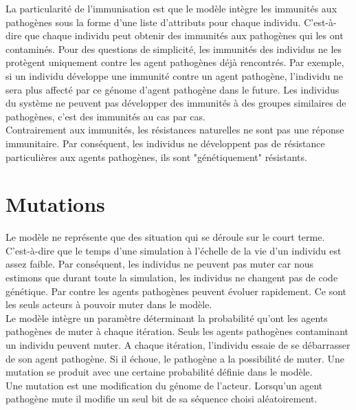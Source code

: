La particularité de l'immunisation est que le modèle intègre les immunités aux pathogènes sous la forme d'une liste d'attributs pour chaque individu. C'est-à-dire que chaque individu peut obtenir des immunités aux pathogènes qui les ont contaminés. Pour des questions de simplicité, les immunités des individus ne les protègent uniquement contre les agent pathogènes déjà rencontrés. Par exemple, si un individu développe une immunité contre un agent pathogène, l'individu ne sera plus affecté par ce génome d'agent pathogène dans le future. Les individus du système ne peuvent pas développer des immunités à des groupes similaires de pathogènes, c'est des immunités au cas par cas.\\

Contrairement aux immunités, les résistances naturelles ne sont pas une réponse immunitaire. Par conséquent, les individus ne développent pas de résistance particulières aux agents pathogènes, ils sont "génétiquement" résistants. 

\section{Mutations}

Le modèle ne représente que des situation qui se déroule sur le court terme. C'est-à-dire que le temps d'une simulation à l'échelle de la vie d'un individu est assez faible. Par conséquent, les individus ne peuvent pas muter car nous estimons que durant toute la simulation, les individus ne changent pas de code génétique. Par contre les agents pathogènes peuvent évoluer rapidement. Ce sont les seuls acteurs à pouvoir muter dans le modèle.\\

Le modèle intègre un paramètre déterminant la probabilité qu'ont les agents pathogènes de muter à chaque itération. Seuls les agents pathogènes contaminant un individu peuvent muter. A chaque itération, l'individu essaie de se débarrasser de son agent pathogène. Si il échoue, le pathogène a la possibilité de muter. Une mutation se produit avec une certaine probabilité définie dans le modèle.\\

Une mutation est une modification du génome de l'acteur. Lorsqu'un agent pathogène mute il modifie un seul bit de sa séquence choisi aléatoirement. 
